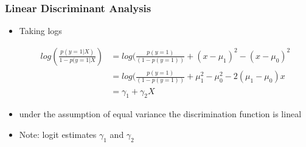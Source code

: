 \documentclass[
  shownotes,
  xcolor={svgnames},
  hyperref={colorlinks,citecolor=DarkBlue,linkcolor=DarkRed,urlcolor=DarkBlue}
  , aspectratio=169]{beamer}
\begin{document}
\begin{frame}[fragile]
\frametitle{Linear Discriminant Analysis}
\begin{itemize}
  \item Taking logs

\begin{align}
  log \left( \frac{p (y=1|X)}{1-p (y=1|X}\right)  &= log(\frac{p(y=1)}{(1-p(y=1))}+(x-\mu_1)^2-(x-\mu_0)^2 \\
  &= log(\frac{p(y=1)}{(1-p(y=1))}+\mu^2_1-\mu^2_0-2(\mu_1-\mu_0)x \\
  &= \gamma_1 +\gamma_2 X
  \end{align}  
  \item under the assumption of equal variance the discrimination function is lineal
  \item Note: logit estimates $\gamma_1$ and $\gamma_2$
\end{itemize}

\end{frame}
\end{document}
